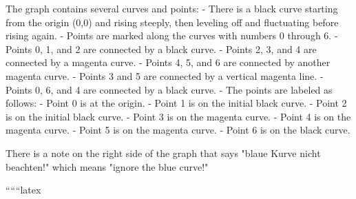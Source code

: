 The graph contains several curves and points:
- There is a black curve starting from the origin (0,0) and rising steeply, then leveling off and fluctuating before rising again.
- Points are marked along the curves with numbers 0 through 6.
- Points 0, 1, and 2 are connected by a black curve.
- Points 2, 3, and 4 are connected by a magenta curve.
- Points 4, 5, and 6 are connected by another magenta curve.
- Points 3 and 5 are connected by a vertical magenta line.
- Points 0, 6, and 4 are connected by a black curve.
- The points are labeled as follows:
  - Point 0 is at the origin.
  - Point 1 is on the initial black curve.
  - Point 2 is on the initial black curve.
  - Point 3 is on the magenta curve.
  - Point 4 is on the magenta curve.
  - Point 5 is on the magenta curve.
  - Point 6 is on the black curve.

There is a note on the right side of the graph that says "blaue Kurve nicht beachten!" which means "ignore the blue curve!"

``````latex


